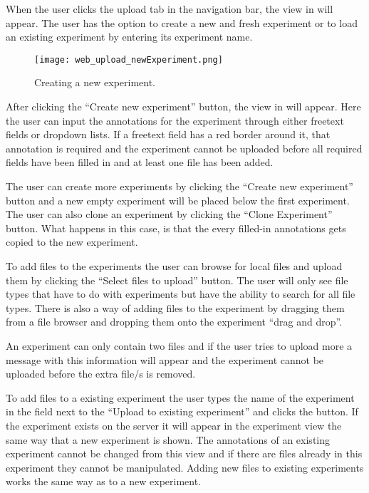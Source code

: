 When the user clicks the upload tab in the navigation bar, the view in  will appear. The user has the option to create a new and fresh experiment or to load an existing experiment by entering its experiment name. 

\begin{figure}[h]
\centering
\texttt{[image: web\_upload\_newExperiment.png]}
\caption{\label{fig:web_upload_newExperiment}Creating a new experiment.}
\end{figure}

After clicking the “Create new experiment” button, the view in  will appear. Here the user can input the annotations for the experiment through either freetext fields or dropdown lists. If a freetext field has a red border around it, that annotation is required and the experiment cannot be uploaded before all required fields have been filled in and at least one file has been added.

The user can create more experiments by clicking the “Create new experiment” button and a new empty experiment will be placed below the first experiment. The user can also clone an experiment by clicking the “Clone Experiment” button. What happens in this case, is that the every filled-in annotations gets copied to the new experiment.

To add files to the experiments the user can browse for local files and upload them by clicking the “Select files to upload” button. The user will only see file types that have to do with experiments but have the ability to search for all file types. There is also a way of adding files to the experiment by dragging them from a file browser and dropping them onto the experiment “drag and drop”.

An experiment can only contain two  files and if the user tries to upload more a message with this information will appear and the experiment cannot be uploaded before the extra  file/s is removed. 

To add files to a existing experiment the user types the name of the experiment in the field next to the “Upload to existing experiment” and clicks the button. If the experiment exists on the server it will appear in the experiment view the same way that a new experiment is shown. The annotations of an existing experiment cannot be changed from this view and if there are files already in this experiment they cannot be manipulated. Adding new files to existing experiments works the same way as to a new experiment.

